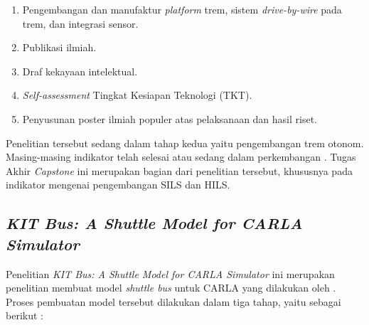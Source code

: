 \begin{enumerate}
    \item Pengembangan dan manufaktur \textit{platform} trem, sistem
    \textit{drive-by-wire} pada trem, dan integrasi sensor.

    \item Publikasi ilmiah.
    \item Draf kekayaan intelektual.
    \item \textit{Self-assessment} Tingkat Kesiapan Teknologi (TKT).
    \item Penyusunan poster ilmiah populer atas pelaksanaan dan hasil riset.

\end{enumerate}

Penelitian tersebut sedang dalam tahap kedua yaitu pengembangan trem otonom.
Masing-masing indikator telah selesai atau sedang dalam perkembangan
\parencite{rispro-trilaksono}. Tugas Akhir \textit{Capstone} ini merupakan
bagian dari penelitian tersebut, khususnya pada indikator mengenai pengembangan
SILS dan HILS.

\subsection{\textit{KIT Bus: A Shuttle Model for CARLA Simulator}}

Penelitian \textit{KIT Bus: A Shuttle Model for CARLA Simulator} ini merupakan
penelitian membuat model \textit{shuttle bus} untuk CARLA yang dilakukan oleh
\cite{related-work-xiang}. Proses pembuatan model tersebut dilakukan dalam tiga
tahap, yaitu sebagai berikut \parencite{related-work-xiang}:

